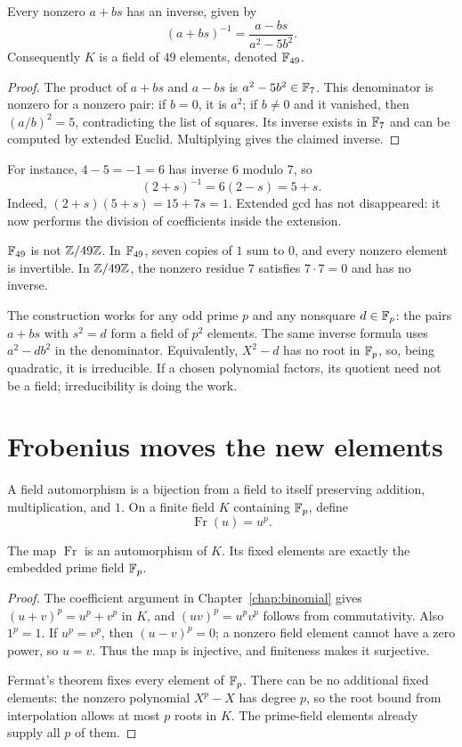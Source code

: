 \begin{proposition}
Every nonzero $a+bs$ has an inverse, given by
\[
 (a+bs)^{-1}=\frac{a-bs}{a^2-5b^2}.
\]
Consequently $K$ is a field of $49$ elements, denoted $\mathbb F_{49}$.
\end{proposition}
\begin{proof}
The product of $a+bs$ and $a-bs$ is $a^2-5b^2\in\mathbb F_7$.
This denominator is nonzero for a nonzero pair: if $b=0$, it is $a^2$;
if $b\ne0$ and it vanished, then $(a/b)^2=5$, contradicting the list
of squares. Its inverse exists in $\mathbb F_7$ and can be computed by
extended Euclid. Multiplying gives the claimed inverse.
\end{proof}

For instance, $4-5=-1=6$ has inverse $6$ modulo $7$, so
\[
 (2+s)^{-1}=6(2-s)=5+s.
\]
Indeed, $(2+s)(5+s)=15+7s=1$.
Extended gcd has not disappeared: it now performs the division of
coefficients inside the extension.

\begin{warningbox}
$\mathbb F_{49}$ is not $\mathbb Z/49\mathbb Z$. In $\mathbb F_{49}$, seven copies of $1$ sum to
$0$, and every nonzero element is invertible. In $\mathbb Z/49\mathbb Z$, the nonzero
residue $7$ satisfies $7\cdot7=0$ and has no inverse.
\end{warningbox}

The construction works for any odd prime $p$ and any nonsquare
$d\in\mathbb F_p$: the pairs $a+bs$ with $s^2=d$ form a field of $p^2$
elements. The same inverse formula uses $a^2-db^2$ in the denominator.
Equivalently, $X^2-d$ has no root in $\mathbb F_p$, so, being quadratic,
it is irreducible. If a chosen polynomial factors, its quotient need
not be a field; irreducibility is doing the work.



\section{Frobenius moves the new elements}
\label{sec:frobenius}

A field automorphism is a bijection from a field to itself preserving
addition, multiplication, and $1$. On a finite field $K$ containing
$\mathbb F_p$, define
\[
 \operatorname{Fr}(u)=u^p.
\]

\begin{theorem}
The map $\operatorname{Fr}$ is an automorphism of $K$. Its fixed
elements are exactly the embedded prime field $\mathbb F_p$.
\end{theorem}
\begin{proof}
The coefficient argument in Chapter~\ref{chap:binomial} gives
$(u+v)^p=u^p+v^p$ in $K$, and $(uv)^p=u^pv^p$ follows from
commutativity. Also $1^p=1$. If $u^p=v^p$, then $(u-v)^p=0$;
a nonzero field element cannot have a zero power, so $u=v$.
Thus the map is injective, and finiteness makes it surjective.

Fermat's theorem fixes every element of $\mathbb F_p$. There can be no
additional fixed elements: the nonzero polynomial $X^p-X$ has degree
$p$, so the root bound from interpolation allows at most $p$ roots in
$K$. The prime-field elements already supply all $p$ of them.
\end{proof}

